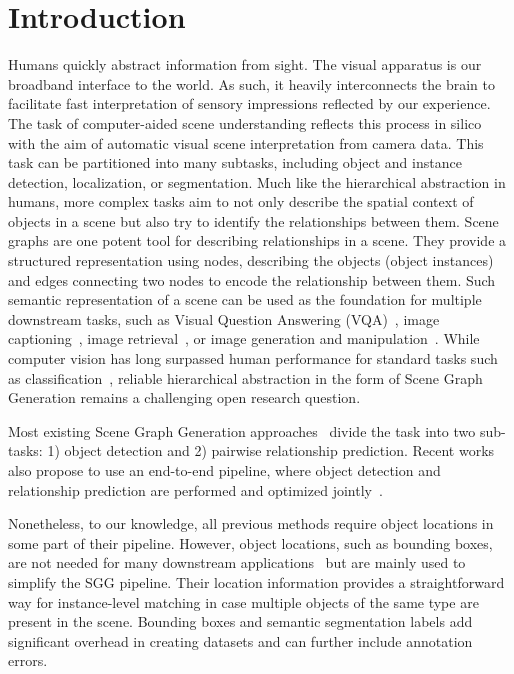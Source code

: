 \documentclass[10pt,twocolumn,letterpaper]{article}
\begin{document}
 \section{Introduction} Humans quickly abstract information from sight. The visual apparatus is our broadband interface to the world. As such, it heavily interconnects the brain to facilitate fast interpretation of sensory impressions reflected by our experience.
The task of computer-aided scene understanding reflects this process in silico with the aim of automatic visual scene interpretation from camera data. This task can be partitioned into many subtasks, including object and instance detection, localization, or segmentation. Much like the hierarchical abstraction in humans, more complex tasks aim to not only describe the spatial context of objects in a scene but also try to identify the relationships between them.
Scene graphs are one potent tool for describing relationships in a scene. They provide a structured representation using nodes, describing the objects (object instances) and edges connecting two nodes to encode the relationship between them.
Such semantic representation of a scene can be used as the foundation for multiple downstream tasks, such as Visual Question Answering (VQA)~\cite{hudson_learning_2019}, image captioning~\cite{zhong_learning_2021}, image retrieval~\cite{johnson_image_2015}, or image generation and manipulation~\cite{dhamo_graph--3d_2021, dhamo_semantic_2020}.
While computer vision has long surpassed human performance for standard tasks such as classification~\cite{he_delving_2015}, reliable hierarchical abstraction in the form of Scene Graph Generation remains a challenging open research question.

Most existing Scene Graph Generation approaches~\cite{xu_scene_2017,zhang_graphical_2019, lin_gps-net_2020, tang_unbiased_2020, zellers_neural_2018, tang_learning_2019, wu_scenegraphfusion_2021, wald_learning_2022} divide the task into two sub-tasks: 1) object detection and 2) pairwise relationship prediction. Recent works also propose to use an end-to-end pipeline, where object detection and relationship prediction are performed and optimized jointly~\cite{teng_structured_2022, cong_reltr_2022, shit_relationformer_2022}. 

Nonetheless, to our knowledge, all previous methods require object locations in some part of their pipeline. However, object locations, such as bounding boxes, are not needed for many downstream applications~\cite{hudson_learning_2019, zhong_learning_2021, johnson_image_2015, dhamo_graph--3d_2021, dhamo_semantic_2020} but are mainly used to simplify the SGG pipeline. Their location information provides a straightforward way for instance-level matching in case multiple objects of the same type are present in the scene. Bounding boxes and semantic segmentation labels add significant overhead in creating datasets and can further include annotation errors.
\end{document}
